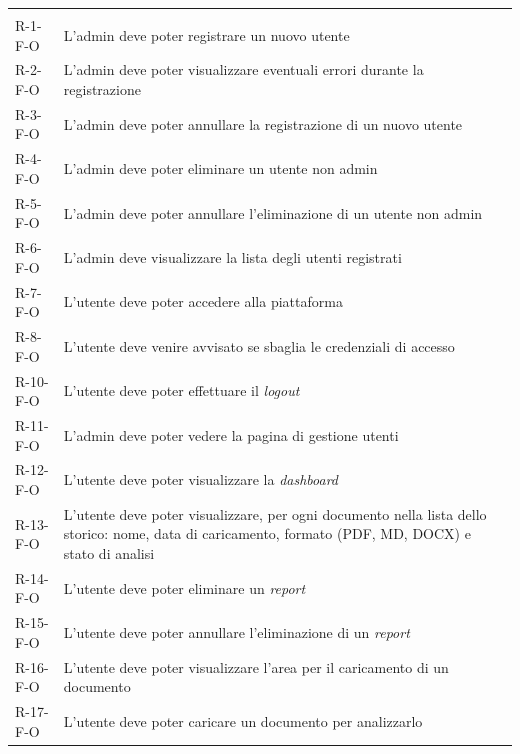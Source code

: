 \begin{longtable}{L{2cm} L{6.4cm} L{3cm}}
\hline
{}
 &  &  \\
\endfirsthead
\hline
{}
 &  &  \\
\endhead
\endfoot

R-1-F-O & L'admin deve poter registrare un nuovo utente &  \\
\hline
R-2-F-O & L'admin deve poter visualizzare eventuali errori durante la registrazione &  \\
\hline
R-3-F-O & L'admin deve poter annullare la registrazione di un nuovo utente &  \\
\hline
R-4-F-O & L'admin deve poter eliminare un utente non admin &  \\
\hline
R-5-F-O & L'admin deve poter annullare l'eliminazione di un utente non admin &  \\
\hline
R-6-F-O & L'admin deve visualizzare la lista degli utenti registrati &  \\
\hline
R-7-F-O & L'utente deve poter accedere alla piattaforma &  \\
\hline
R-8-F-O & L'utente deve venire avvisato se sbaglia le credenziali di accesso &  \\
\hline
R-10-F-O & L'utente deve poter effettuare il \emph{logout} &  \\
\hline
R-11-F-O & L'admin deve poter vedere la pagina di gestione utenti &  \\
\hline
R-12-F-O & L'utente deve poter visualizzare la \emph{dashboard} &  \\
\hline
R-13-F-O & L'utente deve poter visualizzare, per ogni documento nella lista dello storico: nome, data di caricamento, formato (PDF, MD, DOCX) e stato di analisi &  \\
\hline
R-14-F-O & L'utente deve poter eliminare un \emph{report} &  \\
\hline
R-15-F-O & L'utente deve poter annullare l'eliminazione di un \emph{report} &  \\
\hline
R-16-F-O & L'utente deve poter visualizzare l'area per il caricamento di un documento &  \\
\hline
R-17-F-O & L'utente deve poter caricare un documento per analizzarlo &  \\

\end{longtable}
